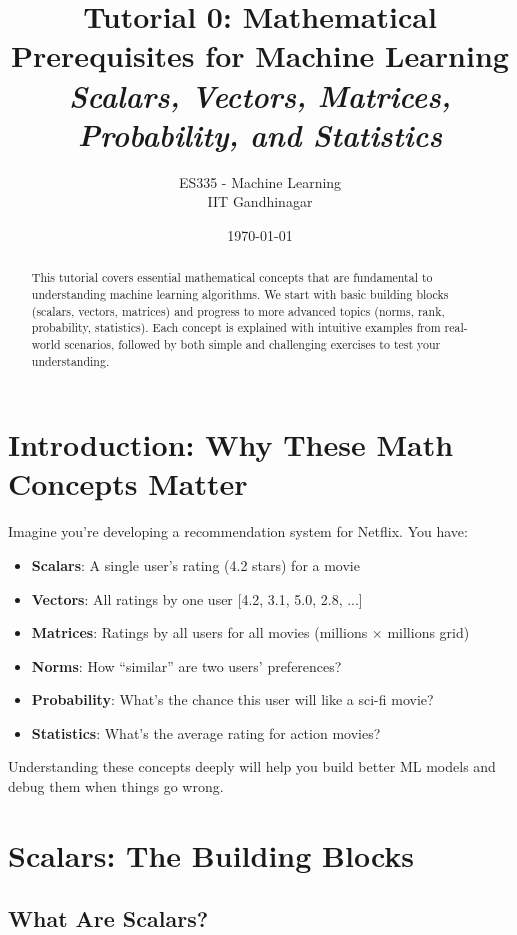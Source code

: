 \documentclass{article}
\title{\textbf{Tutorial 0: Mathematical Prerequisites for Machine Learning} \\ \textit{Scalars, Vectors, Matrices, Probability, and Statistics}}
\author{ES335 - Machine Learning \\ IIT Gandhinagar}
\date{\today}
\newcounter{example}
\newcounter{exercise}
\begin{document}
\maketitle

\begin{abstract}
This tutorial covers essential mathematical concepts that are fundamental to understanding machine learning algorithms. We start with basic building blocks (scalars, vectors, matrices) and progress to more advanced topics (norms, rank, probability, statistics). Each concept is explained with intuitive examples from real-world scenarios, followed by both simple and challenging exercises to test your understanding.
\end{abstract}

\tableofcontents
\newpage

\section{Introduction: Why These Math Concepts Matter}

Imagine you're developing a recommendation system for Netflix. You have:
\begin{itemize}
    \item \textbf{Scalars}: A single user's rating (4.2 stars) for a movie
    \item \textbf{Vectors}: All ratings by one user [4.2, 3.1, 5.0, 2.8, ...]
    \item \textbf{Matrices}: Ratings by all users for all movies (millions × millions grid)
    \item \textbf{Norms}: How ``similar'' are two users' preferences?
    \item \textbf{Probability}: What's the chance this user will like a sci-fi movie?
    \item \textbf{Statistics}: What's the average rating for action movies?
\end{itemize}

Understanding these concepts deeply will help you build better ML models and debug them when things go wrong.

\section{Scalars: The Building Blocks}

\subsection{What Are Scalars?}
\end{document}
